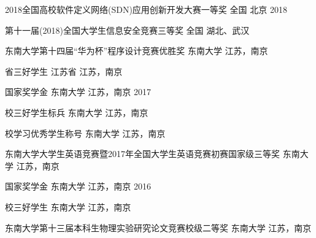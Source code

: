 \vspace{-4.0mm}


\vspace{-1.5mm}
\begin{cvhonors}
\cvhonor
{2018全国高校软件定义网络(SDN)应用创新开发大赛\quad 一等奖} %
{全国} %
{北京} %
{2018} %

\cvhonor
{第十一届(2018)全国大学生信息安全竞赛\quad 三等奖} %
{全国} %
{湖北、武汉} %
{} %

\cvhonor
{东南大学第十四届“华为杯”程序设计竞赛\quad 优胜奖} %
{东南大学} %
{江苏，南京} %
{} %

\cvhonor
{省三好学生} %
{江苏省} %
{江苏，南京} %
{} %

\cvhonor
{国家奖学金} %
{东南大学} %
{江苏，南京} %
{2017} %

\cvhonor
{校三好学生标兵} %
{东南大学} %
{江苏，南京} %
{} %


\cvhonor
{校学习优秀学生称号} %
{东南大学} %
{江苏，南京} %
{} %

\cvhonor
{东南大学大学生英语竞赛暨2017年全国大学生英语竞赛初赛\quad 国家级三等奖}
{东南大学}
{江苏，南京}
{}


\cvhonor
{国家奖学金} %
{东南大学} %
{江苏，南京} %
{2016} %


\cvhonor
{校三好学生} %
{东南大学} %
{江苏，南京} %
{} %


\cvhonor
{东南大学第十三届本科生物理实验研究论文竞赛\quad 校级二等奖}
{东南大学}
{江苏，南京}
{}
\end{cvhonors}
